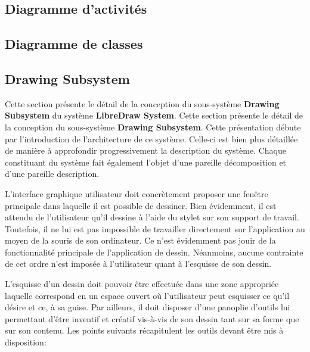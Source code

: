 \documentclass[11pt,a4paper,oldfontcommands]{memoir}
\begin{document}
\subsection{Diagramme d'activités}

\subsection{Diagramme de classes}

\newpage

\subsection{Drawing Subsystem}

Cette section présente le détail de la conception du sous-système \textbf{Drawing Subsystem} du système \textbf{LibreDraw System}. Cette section présente le détail de la conception du sous-système \textbf{Drawing Subsystem}. Cette présentation débute par l'introduction de l'architecture de ce système. Celle-ci est bien plus détaillée de manière à approfondir progressivement la description du système. Chaque constituant du système fait également l'objet d'une pareille décomposition et d'une pareille description.

L'interface graphique utilisateur doit concrètement proposer une fenêtre principale dans laquelle il est possible de dessiner. Bien évidemment, il est attendu de l'utilisateur qu'il dessine à l'aide du stylet sur son support de travail. Toutefois, il ne lui est pas impossible de travailler directement sur l'application au moyen de la souris de son ordinateur. Ce n'est évidemment pas jouir de la fonctionnalité principale de l'application de dessin. Néanmoins, aucune contrainte de cet ordre n'est imposée à l'utilisateur quant à l'esquisse de son dessin.

L'esquisse d'un dessin doit pouvoir être effectuée dans une zone appropriée laquelle correspond en un espace ouvert où l'utilisateur peut esquisser ce qu'il désire et ce, à sa guise. Par ailleurs, il doit disposer d'une panoplie d'outils lui permettant d'être inventif et créatif vis-à-vis de son dessin tant sur sa forme que sur son contenu. Les points suivants récapitulent les outils devant être mis à disposition:
\end{document}
